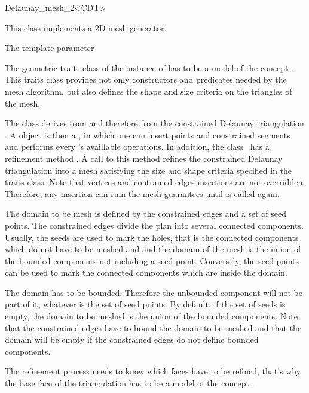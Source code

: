 \begin{ccRefClass}{Delaunay_mesh_2<CDT>}

This class implements a 2D mesh generator.

\ccParameters
The template parameter  \meshcdtrequires{}

The geometric traits class of the instance of  has to be
  a model of the concept . This traits class
  provides not only constructors and predicates needed by the mesh
  algorithm, but also defines the shape and size criteria on the
  triangles of the mesh.


The class \ccRefName{} derives from
   and therefore from
  the constrained Delaunay triangulation . A \ccRefName{}
  object is then a , in which one can insert points and
  constrained segments and performs every 's availlable
  operations. In addition, the class \ccRefName\ has a refinement
  method . A call to this method refines the
  constrained Delaunay triangulation into a mesh satisfying the size
  and shape criteria specified in the traits class. Note that vertices
  and contrained edges insertions are not overridden. Therefore, any
  insertion can ruin the mesh guarantees until  is
  called again.
  
  The domain to be mesh is defined by the constrained edges and a set
  of seed points. The constrained edges divide the plan into several
  connected components. Usually, the seeds are used to mark the holes,
  that is the connected components which do not have to be meshed and
  and the domain of the mesh is the union of the bounded components
  not including a seed point. Conversely, the seed points can be used
  to mark the connected components which are inside the domain.
  
  The domain has to be bounded. Therefore the unbounded component will
  not be part of it, whatever is the set of seed points. By
  default, if the set of seeds is empty, the domain to be meshed is
  the union of the bounded components. Note that the constrained edges
  have to bound the domain to be meshed and that the domain will be
  empty if the constrained edges do not define bounded components.

The refinement process needs to know which faces have to be
  refined, that's why the base face of the triangulation  has
  to be a model of the concept .


\end{ccRefClass}
